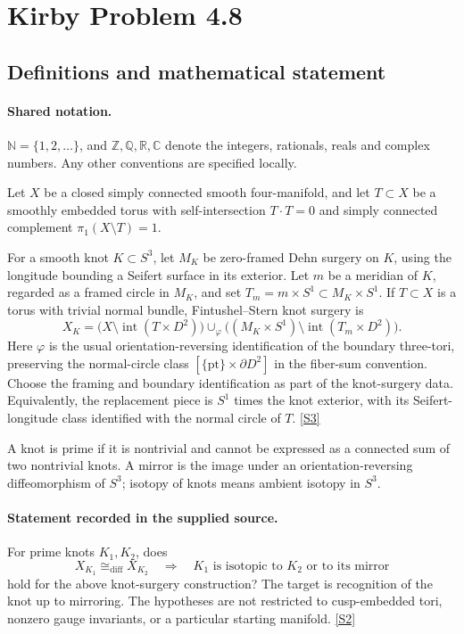 \documentclass[11pt]{article}
\newcommand{\sref}[2]{\hyperlink{source:#1:#2}{[S#2]}}
\begin{document}
\section{Kirby Problem 4.8}\label{statement}

\subsection{Definitions and mathematical statement}

\paragraph{Shared notation.}$\mathbb N=\{1,2,\ldots\}$, and $\mathbb Z,\mathbb Q,\mathbb R,\mathbb C$ denote the integers, rationals, reals and complex numbers. Any other conventions are specified locally.


Let $X$ be a closed simply connected smooth four-manifold, and let $T\subset X$ be a smoothly embedded torus with self-intersection $T\cdot T=0$ and simply connected complement $\pi_1(X\setminus T)=1$.

For a smooth knot $K\subset S^3$, let $M_K$ be zero-framed Dehn surgery on $K$, using the longitude bounding a Seifert surface in its exterior. Let $m$ be a meridian of $K$, regarded as a framed circle in $M_K$, and set $T_m=m\times S^1\subset M_K\times S^1$. If $T\subset X$ is a torus with trivial normal bundle, Fintushel--Stern knot surgery is
\[
X_K=\bigl(X\setminus\operatorname{int}(T\times D^2)\bigr)
\cup_\varphi\bigl((M_K\times S^1)\setminus\operatorname{int}(T_m\times D^2)\bigr).
\]
Here $\varphi$ is the usual orientation-reversing identification of the boundary three-tori, preserving the normal-circle class $[\{\mathrm{pt}\}\times\partial D^2]$ in the fiber-sum convention. Choose the framing and boundary identification as part of the knot-surgery data. Equivalently, the replacement piece is $S^1$ times the knot exterior, with its Seifert-longitude class identified with the normal circle of $T$. \sref{statement}{3}

A knot is prime if it is nontrivial and cannot be expressed as a connected sum of two nontrivial knots. A mirror is the image under an orientation-reversing diffeomorphism of $S^3$; isotopy of knots means ambient isotopy in $S^3$.
\paragraph{Statement recorded in the supplied source.}
For prime knots $K_1,K_2$, does
\[
 X_{K_1}\cong_{\mathrm{diff}}X_{K_2}
 \quad\Longrightarrow\quad
 K_1\text{ is isotopic to }K_2\text{ or to its mirror}
\]
hold for the above knot-surgery construction? The target is recognition of the knot up to mirroring. The hypotheses are not restricted to cusp-embedded tori, nonzero gauge invariants, or a particular starting manifold. \sref{statement}{2}
\end{document}
